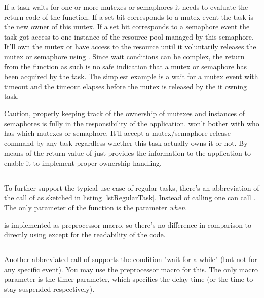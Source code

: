 If a task waits for one or more mutexes or semaphores it needs to evaluate
the return code of the function. If a set bit corresponds to a mutex event
the task is the new owner of this mutex. If a set bit corresponds to a
semaphore event the task got access to one instance of the resource pool
managed by this semaphore. It'll own the mutex or have access to the
resource until it voluntarily releases the mutex or semaphore using
. Since wait conditions can be complex, the return
from the function as such is no safe indication that a mutex or semaphore
has been acquired by the task. The simplest example is a wait for a mutex
event with timeout and the timeout elapses before the mutex is released by
the it owning task.

Caution, properly keeping track of the ownership of mutexes and instances
of semaphores is fully in the responsibility of the application. \rtos{}
won't bother with who has which mutexes or semaphore. It'll accept a
mutex/semaphore release command by any task regardless
whether this task actually owns it or not. By means of the return value of
 \rtos{} just provides the information to the
application to enable it to implement proper ownership handling.


\subsection{}

To further support the typical use case of regular tasks, there's an
abbreviation of the call of  as sketched in
listing \ref{lstRegularTask}. Instead of calling
 one can call
. The only parameter of the
function is the parameter \emph{when}.

 is implemented as preprocessor macro, so
there's no difference in comparison to directly using
 except for the readability of the code.


\subsection{}

Another abbreviated call of  supports the
condition "wait for a while" (but not for any specific event). You may use
the preprocessor macro  for this. The only macro
parameter is the timer parameter, which specifies the delay time (or the
time to stay suspended respectively).

